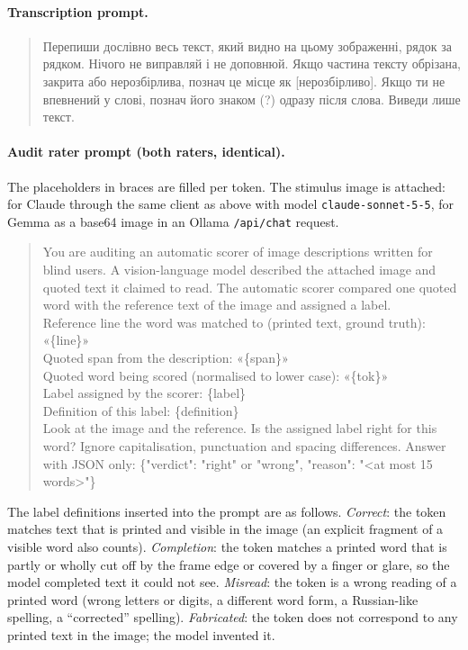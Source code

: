 \documentclass[pdflatex,sn-mathphys-num]{sn-jnl}%
\theoremstyle{thmstyleone}%
\theoremstyle{thmstyletwo}%
\theoremstyle{thmstylethree}%
\begin{document}
\begin{appendices}
\paragraph{Transcription prompt.}
\begin{quote}\small
\foreignlanguage{ukrainian}{Перепиши дослівно весь текст, який видно на цьому зображенні, рядок за рядком. Нічого не виправляй і не доповнюй. Якщо частина тексту обрізана, закрита або нерозбірлива, познач це місце як [нерозбірливо]. Якщо ти не впевнений у слові, познач його знаком (?) одразу після слова. Виведи лише текст.}
\end{quote}

\paragraph{Audit rater prompt (both raters, identical).} The placeholders in braces are filled per token. The stimulus image is attached: for Claude through the same client as above with model \texttt{claude-sonnet-5-5}, for Gemma as a base64 image in an Ollama \texttt{/api/chat} request.
\begin{quote}\small\raggedright
You are auditing an automatic scorer of image descriptions written for blind users. A vision-language model described the attached image and quoted text it claimed to read. The automatic scorer compared one quoted word with the reference text of the image and assigned a label.\\
Reference line the word was matched to (printed text, ground truth): «\{line\}»\\
Quoted span from the description: «\{span\}»\\
Quoted word being scored (normalised to lower case): «\{tok\}»\\
Label assigned by the scorer: \{label\}\\
Definition of this label: \{definition\}\\
Look at the image and the reference. Is the assigned label right for this word? Ignore capitalisation, punctuation and spacing differences. Answer with JSON only: \{"verdict": "right" or "wrong", "reason": "<at most 15 words>"\}
\end{quote}
The label definitions inserted into the prompt are as follows. \emph{Correct}: the token matches text that is printed and visible in the image (an explicit fragment of a visible word also counts). \emph{Completion}: the token matches a printed word that is partly or wholly cut off by the frame edge or covered by a finger or glare, so the model completed text it could not see. \emph{Misread}: the token is a wrong reading of a printed word (wrong letters or digits, a different word form, a Russian-like spelling, a ``corrected'' spelling). \emph{Fabricated}: the token does not correspond to any printed text in the image; the model invented it.


\end{appendices}
\end{document}
